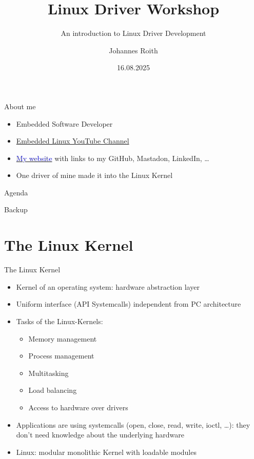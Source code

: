 \documentclass[aspectratio=169]{beamer}
\title{Linux Driver Workshop}
\subtitle{An introduction to Linux Driver Development}
\author{Johannes Roith}
\date{16.08.2025}
\begin{document}
\begin{frame}
  \titlepage
\end{frame}

\begin{frame}{About me}
	\begin{itemize}
		\item Embedded Software Developer
		\item \href{https://www.youtube.com/@johannes4gnu_linux96}{Embedded Linux YouTube Channel}
		\item \href{https://gnu-linux.rocks}{\textcolor{blue}{My website}} with links to my GitHub, Mastadon, LinkedIn, \dots
		\item One driver of mine made it into the Linux Kernel
	\end{itemize}
\end{frame}

\begin{frame}{Agenda}
	\tableofcontents[sections={1-10}]
\end{frame}

\begin{frame}{Backup}
	\tableofcontents[sections={11-}]
\end{frame}

\section{The Linux Kernel}
\begin{frame}{The Linux Kernel}
	\begin{itemize}
		\item Kernel of an operating system: hardware abstraction layer
		\item Uniform interface (API Systemcalls) independent from PC architecture
		\item Tasks of the Linux-Kernels:
			\begin{itemize}
				\item Memory management
				\item Process management
				\item Multitasking
				\item Load balancing
				\item Access to hardware over drivers
			\end{itemize}
		\item Applications are using systemcalls (open, close, read, write, ioctl, \dots{}): they don't need knowledge about the underlying hardware
		\item Linux: modular monolithic Kernel with loadable modules
	\end{itemize}
\end{frame}
\end{document}
